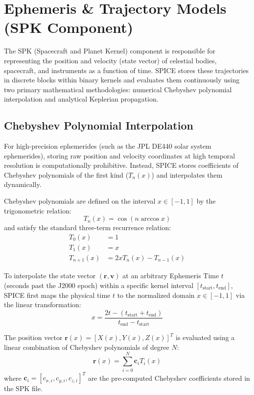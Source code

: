 \documentclass{acta}
\begin{document}
\section{Ephemeris \& Trajectory Models (SPK Component)}
The SPK (Spacecraft and Planet Kernel) component is responsible for representing the position and velocity (state vector) of celestial bodies, spacecraft, and instruments as a function of time. SPICE stores these trajectories in discrete blocks within binary kernels and evaluates them continuously using two primary mathematical methodologies: numerical Chebyshev polynomial interpolation and analytical Keplerian propagation.

\subsection{Chebyshev Polynomial Interpolation}
For high-precision ephemerides (such as the JPL DE440 solar system ephemerides), storing raw position and velocity coordinates at high temporal resolution is computationally prohibitive. Instead, SPICE stores coefficients of Chebyshev polynomials of the first kind ($T_n(x)$) and interpolates them dynamically. 

Chebyshev polynomials are defined on the interval $x \in [-1, 1]$ by the trigonometric relation:
\begin{equation}
T_n(x) = \cos(n \arccos x)
\end{equation}
and satisfy the standard three-term recurrence relation:
\begin{align}
T_0(x) &= 1 \\
T_1(x) &= x \\
T_{n+1}(x) &= 2x T_n(x) - T_{n-1}(x)
\end{align}

To interpolate the state vector $(\mathbf{r}, \mathbf{v})$ at an arbitrary Ephemeris Time $t$ (seconds past the J2000 epoch) within a specific kernel interval $[t_{\text{start}}, t_{\text{end}}]$, SPICE first maps the physical time $t$ to the normalized domain $x \in [-1, 1]$ via the linear transformation:
\begin{equation}
x = \frac{2t - (t_{\text{start}} + t_{\text{end}})}{t_{\text{end}} - t_{\text{start}}}
\end{equation}

The position vector $\mathbf{r}(x) = [X(x), Y(x), Z(x)]^T$ is evaluated using a linear combination of Chebyshev polynomials of degree $N$:
\begin{equation}
\mathbf{r}(x) = \sum_{i=0}^N \mathbf{c}_i T_i(x)
\end{equation}
where $\mathbf{c}_i = [c_{x,i}, c_{y,i}, c_{z,i}]^T$ are the pre-computed Chebyshev coefficients stored in the SPK file.
\end{document}
